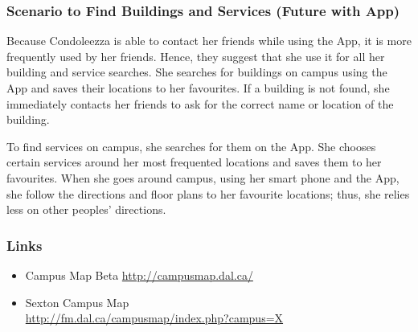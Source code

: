\documentclass{article}
\begin{document}
\subsubsection{Scenario to Find Buildings and Services (Future with App)}

Because Condoleezza is able to contact her friends while using the App, it is
more frequently used by her friends. Hence, they suggest that she use it for all
her building and service searches. She searches for buildings on campus using
the App and saves their locations to her favourites. If a building is not found,
she immediately contacts her friends to ask for the correct name or location of
the building. 

To find services on campus, she searches for them on the App. She chooses
certain services around her most frequented locations and saves them to her
favourites. When she goes around campus, using her smart phone and the App, she
follow the directions and floor plans to her favourite locations; thus, she
relies less on other peoples’ directions.

\subsubsection{Links}
\begin{itemize}
\item Campus Map Beta \hfill                      \url{http://campusmap.dal.ca/}
\item Sexton Campus Map \\
                      \hfill \url{http://fm.dal.ca/campusmap/index.php?campus=X}
\end{itemize}
\end{document}
